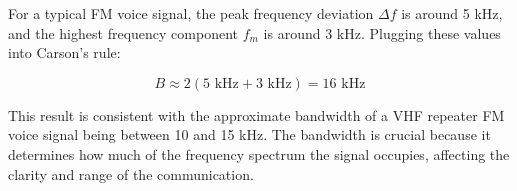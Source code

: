 For a typical FM voice signal, the peak frequency deviation \( \Delta f \) is around 5 kHz, and the highest frequency component \( f_m \) is around 3 kHz. Plugging these values into Carson's rule:

\[
B \approx 2(5 \text{ kHz} + 3 \text{ kHz}) = 16 \text{ kHz}
\]

This result is consistent with the approximate bandwidth of a VHF repeater FM voice signal being between 10 and 15 kHz. The bandwidth is crucial because it determines how much of the frequency spectrum the signal occupies, affecting the clarity and range of the communication.

